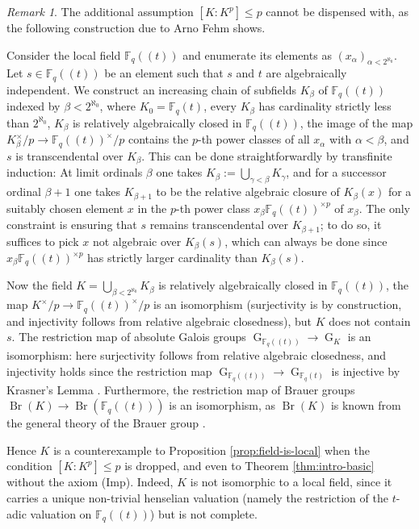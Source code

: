 \documentclass[a4paper, british, oneside]{amsart}
\newcommand{\F}{\mathbb{F}}
\DeclareMathOperator{\G}{G}
\DeclareMathOperator{\Br}{Br}
\newcommand{\pow}[1]{(\!(#1)\!)}
\theoremstyle{definition}
\theoremstyle{remark}
\newtheorem{remark}[theorem]{Remark}
\begin{document}
\begin{remark}\label{rem:condition-imperfection-needed}
  The additional assumption $[K : K^p] \leq p$ cannot be dispensed with, as the following construction due to Arno Fehm shows.

  Consider the local field $\F_q\pow{t}$ and enumerate its elements as $(x_\alpha)_{\alpha < 2^{\aleph_0}}$.
  Let $s \in \F_q\pow{t}$ be an element such that $s$ and $t$ are algebraically independent.
  We construct an increasing chain of subfields $K_\beta$ of $\F_q\pow{t}$ indexed by $\beta < 2^{\aleph_0}$,
  where $K_0 = \F_q(t)$, every $K_\beta$ has cardinality strictly less than $2^{\aleph_0}$,
  $K_\beta$ is relatively algebraically closed in $\F_q\pow{t}$,
  the image of the map $K_\beta^\times/p \to \F_q\pow{t}^\times/p$ contains the $p$-th power classes of all $x_\alpha$ with $\alpha < \beta$,
  and $s$ is transcendental over $K_\beta$.
  This can be done straightforwardly by transfinite induction:
  At limit ordinals $\beta$ one takes $K_\beta := \bigcup_{\gamma < \beta} K_\gamma$,
  and for a successor ordinal $\beta+1$ one takes $K_{\beta+1}$ to be the relative algebraic closure of $K_\beta(x)$ for a suitably chosen element $x$ in the $p$-th power class $x_\beta \F_q\pow{t}^{\times p}$ of $x_\beta$.
  The only constraint is ensuring that $s$ remains transcendental over $K_{\beta+1}$;
  to do so, it suffices to pick $x$ not algebraic over $K_\beta(s)$,
  which can always be done since $x_\beta \F_q\pow{t}^{\times p}$ has strictly larger cardinality than $K_\beta(s)$.

  Now the field $K = \bigcup_{\beta < 2^{\aleph_0}} K_\beta$ is relatively algebraically closed in $\F_q\pow{t}$, the map $K^\times/p \to \F_q\pow{t}^\times/p$ is an isomorphism (surjectivity is by construction, and injectivity follows from relative algebraic closedness), but $K$ does not contain $s$.
  The restriction map of absolute Galois groups $\G_{\F_q\pow{t}} \to \G_K$ is an isomorphism:
  here surjectivity follows from relative algebraic closedness,
  and injectivity holds since the restriction map $\G_{\F_q\pow{t}} \to \G_{\F_q(t)}$ is injective by Krasner's Lemma \cite[Corollary 18.5.3]{Efrat_ValuationsOrderingsMilnorKTheory}.
  Furthermore, the restriction map of Brauer groups $\Br(K) \to \Br(\F_q\pow{t})$ is an isomorphism,
  as $\Br(K)$ is known from the general theory of the Brauer group
  \cite[Corollaire 2.3]{Grothendieck_Brauer3}.

  Hence $K$ is a counterexample to Proposition \ref{prop:field-is-local} when the condition $[K : K^p] \leq p$ is dropped, and even to Theorem \ref{thm:intro-basic} without the axiom (Imp).
  Indeed, $K$ is not isomorphic to a local field, since it carries a unique non-trivial henselian valuation (namely the restriction of the $t$-adic valuation on $\F_q\pow{t}$) but is not complete.
\end{remark}
\end{document}
